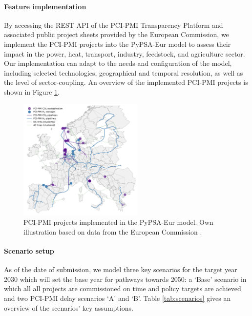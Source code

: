 \documentclass[10pt]{article}
\let\autocite\cite
\begin{document}
\paragraph{Feature implementation} By accessing the REST API of the PCI-PMI Transparency Platform \autocite{europeancommissionPCIPMITransparencyPlatform2024} and associated public project sheets provided by the European Commission, we implement the PCI-PMI projects into the PyPSA-Eur model to assess their impact in the power, heat, transport, industry, feedstock, and agriculture sector. Our implementation can adapt to the needs and configuration of the model, including selected technologies, geographical and temporal resolution, as well as the level of sector-coupling. An overview of the implemented PCI-PMI projects is shown in Figure \ref{fig:pci_pmi_projects_map}.

\begin{figure}[!htbp]
    \centering
    \includegraphics[width=0.55\textwidth]{pci_pmi_projects_map}
    \caption{PCI-PMI projects implemented in the PyPSA-Eur model. Own illustration based on data from the European Commission \autocite{europeancommissionPCIPMITransparencyPlatform2024}.}
    \label{fig:pci_pmi_projects_map}
\end{figure}

\paragraph{Scenario setup} As of the date of submission, we model three key scenarios for the target year 2030 which will set the base year for pathways towards 2050: a `Base' scenario in which all all projects are commissioned on time and policy targets are achieved and two PCI-PMI delay scenarios `A' and `B'. Table \ref{tab:scenarios} gives an overview of the scenarios' key assumptions.
\end{document}
